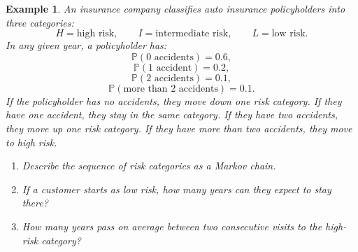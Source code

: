 \documentclass[12pt,a4paper]{article}
\theoremstyle{lecturestyle}
\newtheorem{example}{Example}
\newcommand{\Prob}{\mathbb{P}}
\begin{document}
\begin{example}
An insurance company classifies auto insurance policyholders into three categories:
\[
H=\text{high risk},\qquad I=\text{intermediate risk},\qquad L=\text{low risk}.
\]
In any given year, a policyholder has:
\[
\Prob(0\text{ accidents})=0.6,
\]
\[
\Prob(1\text{ accident})=0.2,
\]
\[
\Prob(2\text{ accidents})=0.1,
\]
\[
\Prob(\text{more than 2 accidents})=0.1.
\]
If the policyholder has no accidents, they move down one risk category. If they have one accident, they stay in the same category. If they have two accidents, they move up one risk category. If they have more than two accidents, they move to high risk.

\begin{enumerate}[label=(\alph*)]
    \item Describe the sequence of risk categories as a Markov chain.
    \item If a customer starts as low risk, how many years can they expect to stay there?
    \item How many years pass on average between two consecutive visits to the high-risk category?
\end{enumerate}
\end{example}
\end{document}
